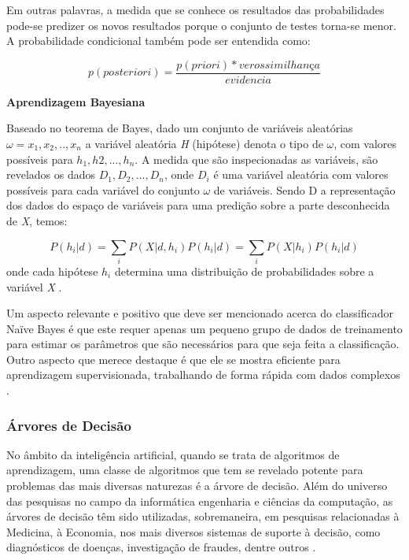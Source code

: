 Em outras palavras, a medida que se conhece os resultados das probabilidades pode-se predizer os novos resultados porque o conjunto de testes torna-se menor. A probabilidade condicional também pode ser entendida como:

\begin{equation}
p(posteriori) = \frac{p(priori) * verossimilhança}{evidencia}
\end{equation}

\vspace{5mm}

\textbf{Aprendizagem Bayesiana}
\vspace{5mm}

Baseado no teorema de Bayes, dado um conjunto de variáveis aleatórias $\omega = {x_{1}, x_{2},..,x_{n}}$ a variável aleatória \textit{H} (hipótese) denota o tipo de $\omega$, com valores possíveis para $h_{1}, h{2},...,h_{n}$. A medida que são inspecionadas as variáveis, são revelados os dados $D_{1}, D_{2},...,D_{n}$, onde $D_{i}$ é uma variável aleatória com valores possíveis para cada variável do conjunto $\omega$ de variáveis. Sendo D a representação dos dados do espaço de variáveis para uma predição sobre a parte desconhecida de \textit{X}, temos:

\begin{equation}
P(h_{i}|d) = \sum_{i}P(X|d,h_{i})P(h_{i}|d) = \sum_{i}P(X|h_{i})P(h_{i}|d)
\end{equation}
 onde cada hipótese $h_{i}$ determina uma distribuição de probabilidades sobre a variável \textit{X} \cite{NorvigRussel2004}.

Um aspecto relevante e positivo que deve ser mencionado acerca do classificador Naïve Bayes é que este requer apenas um pequeno grupo de dados de treinamento para estimar os parâmetros que são necessários para que seja feita a classificação. Outro aspecto que merece destaque é que ele se mostra eficiente para aprendizagem supervisionada, trabalhando de forma rápida com dados complexos \cite{policarpo2015semantic}.


\subsubsection{Árvores de Decisão}

\vspace{5mm}

No âmbito da inteligência artificial, quando se trata de algoritmos de aprendizagem, uma classe de algoritmos que tem se revelado potente para problemas das mais diversas naturezas é a árvore de decisão. Além do universo das pesquisas no campo da informática engenharia e ciências da computação, as árvores de decisão têm sido utilizadas, sobremaneira, em pesquisas relacionadas à Medicina, à Economia, nos mais diversos sistemas de suporte à decisão, como diagnósticos de doenças, investigação de fraudes, dentre outros \cite{Camilo}.


